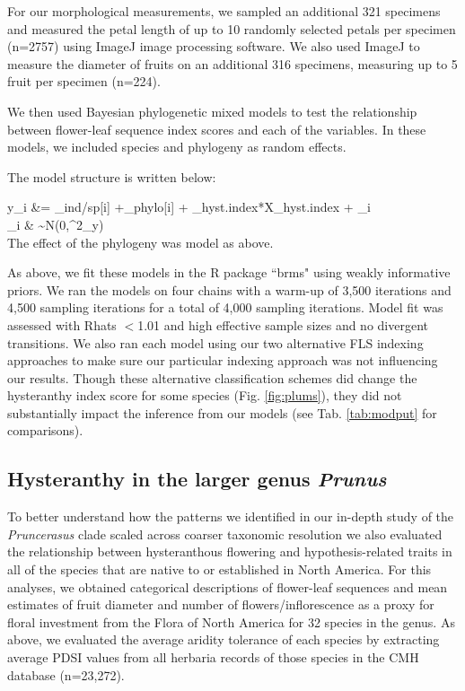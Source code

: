 \documentclass{article}[11pt]
\begin{document}
\noindent For our morphological measurements, we sampled an additional 321 specimens and measured the petal length of up to 10 randomly selected petals per specimen (n=2757) using ImageJ image processing software. We also used ImageJ to measure the diameter of fruits on an additional 316 specimens, measuring up to 5 fruit per specimen (n=224).

We then used Bayesian phylogenetic mixed models to test the relationship between flower-leaf sequence index scores and each of the variables. In these models, we included species and phylogeny as random effects. 

The model structure is written below: 

  y_i &= \alpha_{ind/sp[i]} +\alpha_{phylo[i]} + \beta_{hyst.index}*X_{hyst.index} + \epsilon_i\\
  
  \epsilon_i & \sim N(0,\sigma^2_y) \\ %
  
  \noindent The effect of the phylogeny was model as above.%
  
As above, we fit these models in the R package ``brms" \citep{Burkner2018} using weakly informative priors. We ran the models on four chains with a warm-up of 3,500 iterations and 4,500 sampling iterations for a total of 4,000 sampling iterations. Model fit was assessed with Rhats $<$1.01 and high effective sample sizes and no divergent transitions. We also ran each model using our two alternative FLS indexing approaches to make sure our particular indexing approach was not influencing our results. Though these alternative classification schemes did change the hysteranthy index score for some species (Fig. \ref{fig:plums}), they did not substantially impact the inference from our models (see Tab. \ref{tab:modput} for comparisons).

\subsection*{Hysteranthy in the larger genus \textit{Prunus}}

To better understand how the patterns we identified in our in-depth study of the \textit{Pruncerasus} clade scaled across coarser taxonomic resolution we also evaluated the relationship between hysteranthous flowering and hypothesis-related traits in all of the  species that are native to or established in North America. For this analyses, we obtained categorical descriptions of flower-leaf sequences and mean estimates of fruit diameter and number of flowers/inflorescence as a proxy for floral investment from the Flora of North America \citep{} for 32 species in the genus. As above, we evaluated the average aridity tolerance of each species by extracting average PDSI values from all herbaria records of those species in the CMH database (n=23,272). 
 
\end{document}
